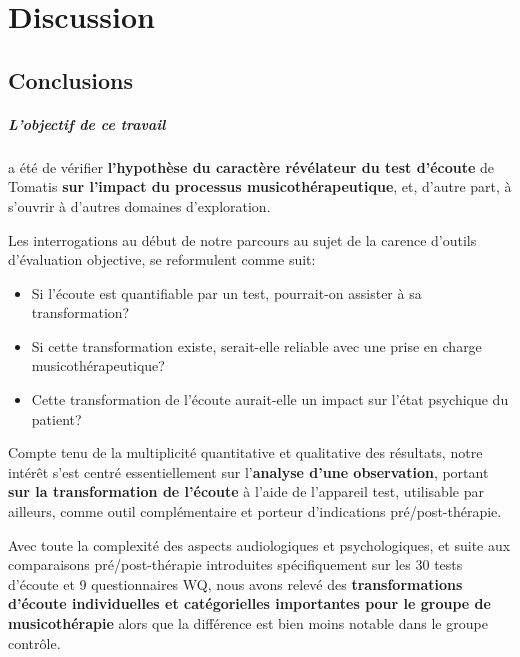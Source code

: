 
\chapter{Discussion}
\label{Conclusions}
\section{Conclusions}

\paragraph{L'objectif de ce travail} a été de vérifier\textbf{ l'hypothèse du caractère
révélateur du test
d'écoute }de Tomatis \textbf{ sur l'impact du processus musicothérapeutique},
et, d'autre part, à s'ouvrir à d'autres
domaines d'exploration.

Les interrogations au début de notre parcours au
sujet de la carence d'outils d'évaluation objective, se
reformulent comme suit:
\begin{itemize}
     \item
       Si l'écoute est quantifiable  par un test, pourrait-on assister à sa
transformation?
\item Si cette transformation existe, serait-elle reliable avec
une prise en charge musicothérapeutique?
\item Cette transformation de l'écoute aurait-elle un impact sur l'état
psychique du patient? %
\end{itemize}



  Compte tenu de la multiplicité quantitative et qualitative des
  résultats, notre intérêt s'est centré essentiellement sur l'\textbf{analyse d'une
  observation}, portant \textbf{sur la transformation de l'écoute} à l'aide de
  l'appareil test, utilisable par ailleurs, comme outil complémentaire
  et porteur d'indications pré/post-thérapie.

  Avec toute la
  complexité des aspects audiologiques et psychologiques,
  et suite aux comparaisons
  pré/post-thérapie introduites spécifiquement sur les 30 tests d'écoute et 9 questionnaires WQ, nous
  avons relevé des \textbf{transformations d'écoute
   individuelles et
  catégorielles importantes pour le groupe de musicothérapie} alors que
  la différence est bien moins notable dans le groupe contrôle.



